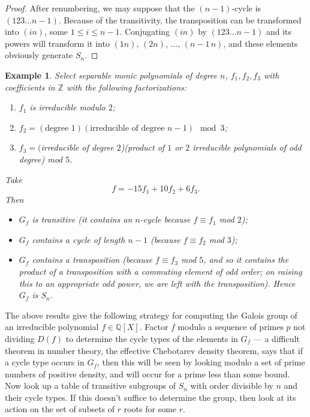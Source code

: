 \documentclass[a4paper,11pt,final,openany]{memoir}
\newtheorem{example}[X]{Example}
\theoremstyle{nonumberplain}
\newtheorem{proof}{Proof.}
\begin{document}
\begin{proof}
After renumbering, we may suppose that the $(n-1)$-cycle is $(123\ldots n-1)$.
Because of the transitivity, the transposition can be transformed into $(in)$,
some $1\leq i\leq n-1$. Conjugating $(in)$ by $(123\ldots n-1)$ and its powers
will transform it into $(1n)$, $(2n)$, $\ldots$, $(n-1\,n)$, and these
elements obviously generate $S_{n}.$
\end{proof}

\begin{example}
\label{cg24}Select separable monic polynomials of degree $n$, $f_{1}%
,f_{2},f_{3}$ with coefficients in $\mathbb{Z}$ with the following factorizations:

\begin{enumerate}
\item $f_{1}$ is irreducible modulo $2$;

\item $f_{2}=(\text{degree }1)(\text{irreducible of degree }n-1)\mod3$;

\item $f_{3}=($irreducible of degree $2$)(product of $1$ or $2$ irreducible
polynomials of odd degree) mod $5$.
\end{enumerate}

\noindent Take
\[
f=-15f_{1}+10f_{2}+6f_{3}.
\]
Then

\begin{itemize}
\item[(i)] $G_{f}$ is transitive (it contains an $n$-cycle because $f\equiv
f_{1}$ mod $2$);

\item[(ii)] $G_{f}$ contains a cycle of length $n-1$ (because $f\equiv f_{2}$
mod $3$);

\item[(iii)] $G_{f}$ contains a transposition (because $f\equiv f_{3}$ mod $5
$, and so it contains the product of a transposition with a commuting element
of odd order; on raising this to an appropriate odd power, we are left with
the transposition). Hence $G_{f}$ is $S_{n}.$
\end{itemize}
\end{example}

The above results give the following strategy for computing the Galois group
of an irreducible polynomial $f\in\mathbb{Q}[X]$. Factor $f$ modulo a sequence
of primes $p$ not dividing $D(f)$ to determine the cycle types of the elements
in $G_{f}$ --- a difficult theorem in number theory, the effective Chebotarev
density theorem, says that if a cycle type occurs in $G_{f}$, then this will
be seen by looking modulo a set of prime numbers of positive density, and will
occur for a prime less than some bound. Now look up a table of transitive
subgroups of $S_{n}$ with order divisible by $n$ and their cycle types. If
this doesn't suffice to determine the group, then look at its action on the
set of subsets of $r$ roots for some $r$.
\end{document}
